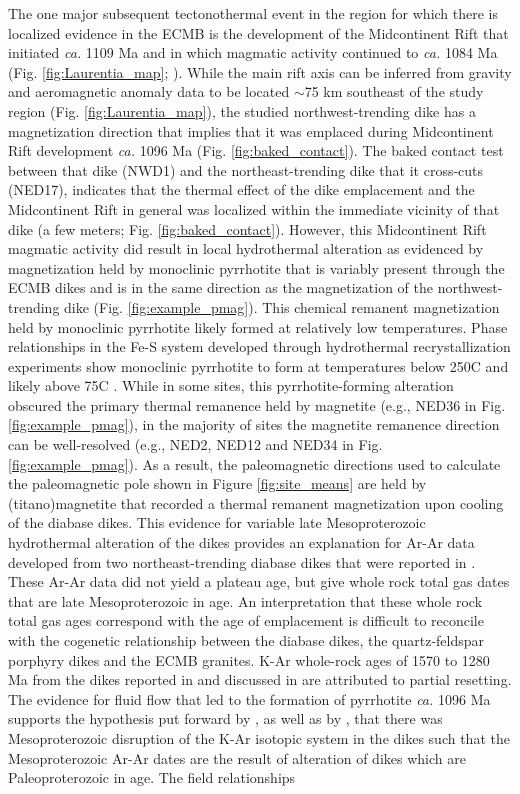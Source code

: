 \documentclass[draft]{agujournal2019}
\begin{document}
The one major subsequent tectonothermal event in the region for which there is localized evidence in the ECMB is the development of the Midcontinent Rift that initiated \textit{ca.} 1109 Ma and in which magmatic activity continued to \textit{ca.} 1084 Ma (Fig. \ref{fig:Laurentia_map}; ). While the main rift axis can be inferred from gravity and aeromagnetic anomaly data to be located $\sim$75 km southeast of the study region (Fig. \ref{fig:Laurentia_map}), the studied northwest-trending dike has a magnetization direction that implies that it was emplaced during Midcontinent Rift development \textit{ca.} 1096 Ma (Fig. \ref{fig:baked_contact}). The baked contact test between that dike (NWD1) and the northeast-trending dike that it cross-cuts (NED17), indicates that the thermal effect of the dike emplacement and the Midcontinent Rift in general was localized within the immediate vicinity of that dike (a few meters; Fig. \ref{fig:baked_contact}). However, this Midcontinent Rift magmatic activity did result in local hydrothermal alteration as evidenced by magnetization held by monoclinic pyrrhotite that is variably present through the ECMB dikes and is in the same direction as the magnetization of the northwest-trending dike (Fig. \ref{fig:example_pmag}). This chemical remanent magnetization held by monoclinic pyrrhotite likely formed at relatively low temperatures. Phase relationships in the Fe-S system developed through hydrothermal recrystallization experiments show monoclinic pyrrhotite to form at temperatures below 250\textdegree C and likely above 75\textdegree C \cite{Kissin1982a}. While in some sites, this pyrrhotite-forming alteration obscured the primary thermal remanence held by magnetite (e.g., NED36 in Fig. \ref{fig:example_pmag}), in the majority of sites the magnetite remanence direction can be well-resolved (e.g., NED2, NED12 and NED34 in Fig. \ref{fig:example_pmag}). As a result, the paleomagnetic directions used to calculate the paleomagnetic pole shown in Figure \ref{fig:site_means} are held by (titano)magnetite that recorded a thermal remanent magnetization upon cooling of the diabase dikes. This evidence for variable late Mesoproterozoic hydrothermal alteration of the dikes provides an explanation for Ar-Ar data developed from two northeast-trending diabase dikes that were reported in . These Ar-Ar data did not yield a plateau age, but give whole rock total gas dates that are late Mesoproterozoic in age. An interpretation that these whole rock total gas ages correspond with the age of emplacement is difficult to reconcile with the cogenetic relationship between the diabase dikes, the quartz-feldspar porphyry dikes and the ECMB granites. K-Ar whole-rock ages of 1570 to 1280 Ma from the dikes reported in  and discussed in  are attributed to partial resetting. The evidence for fluid flow that led to the formation of pyrrhotite \textit{ca.} 1096 Ma supports the hypothesis put forward by , as well as by , that there was Mesoproterozoic disruption of the K-Ar isotopic system in the dikes such that the Mesoproterozoic Ar-Ar dates are the result of alteration of dikes which are Paleoproterozoic in age. The field relationships 
\end{document}
